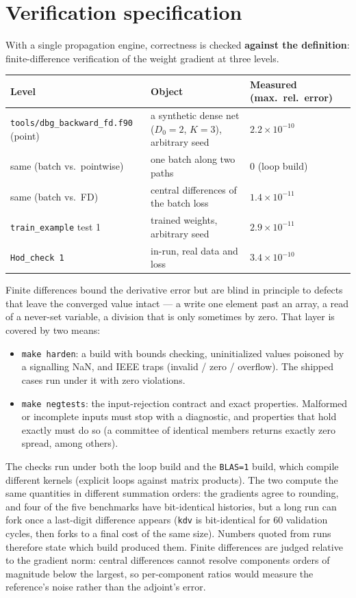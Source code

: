 \documentclass[10pt,a4paper]{article}
\newcommand{\code}[1]{\texttt{#1}}
\begin{document}
\section{Verification specification}
\label{sec:verify}

With a single propagation engine, correctness is checked
\textbf{against the definition}: finite-difference verification of
the weight gradient at three levels.

\begin{longtable}{@{}p{}p{}p{}@{}}
\toprule
Level & Object & Measured (max.\ rel.\ error) \\
\midrule
\endhead
\code{tools/dbg\_backward\_fd.f90} (point) & a synthetic dense net ($D_0=2$, $K=3$), arbitrary seed & $2.2\times10^{-10}$ \\
same (batch vs.\ pointwise) & one batch along two paths & $0$ (loop build)\\
same (batch vs.\ FD) & central differences of the batch loss & $1.4\times10^{-11}$ \\
\code{train\_example} test 1 & trained weights, arbitrary seed & $2.9\times10^{-11}$ \\
\code{Hod\_check 1} & in-run, real data and loss & $3.4\times10^{-10}$ \\
\bottomrule
\end{longtable}

Finite differences bound the derivative error but are blind in
principle to defects that leave the converged value intact --- a
write one element past an array, a read of a never-set variable, a
division that is only sometimes by zero. That layer is covered by two
means:

\begin{itemize}[leftmargin=1.4em]
\item \code{make harden}: a build with bounds checking, uninitialized
      values poisoned by a signalling NaN, and IEEE traps (invalid /
      zero / overflow). The shipped cases run under it with zero
      violations.
\item \code{make negtests}: the input-rejection contract and exact
      properties. Malformed or incomplete inputs must stop with a
      diagnostic, and properties that hold exactly must do so (a
      committee of identical members returns exactly zero spread,
      among others).
\end{itemize}

The checks run under both the loop build and the \code{BLAS=1}
build, which compile different kernels (explicit loops against
matrix products). The two compute the same quantities in different
summation orders: the gradients agree to rounding, and four of the
five benchmarks have bit-identical histories, but a long run can
fork once a last-digit difference appears (\code{kdv} is
bit-identical for 60 validation cycles, then forks to a final cost
of the same size). Numbers quoted from runs therefore state which
build produced them. Finite differences are judged relative to the
gradient norm: central differences cannot resolve components orders
of magnitude below the largest, so per-component ratios would
measure the reference's noise rather than the adjoint's error.
\end{document}
